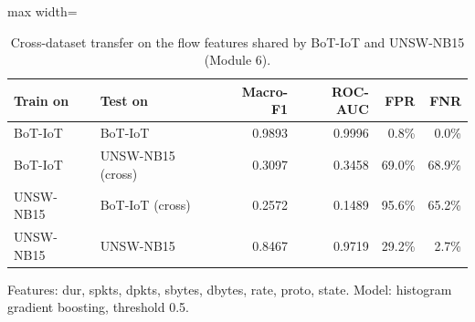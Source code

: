 \begin{table}[t]
\centering
\caption{Cross-dataset transfer on the flow features shared by BoT-IoT and UNSW-NB15 (Module 6).}
\label{tab:transfer}
\footnotesize
\setlength{\tabcolsep}{3.5pt}
\begin{adjustbox}{max width=\linewidth}
\begin{tabular}{llrrrr}
\toprule
Train on & Test on & Macro-F1 & ROC-AUC & FPR & FNR \\
\midrule
BoT-IoT & BoT-IoT & 0.9893 & 0.9996 & 0.8\% & 0.0\% \\
BoT-IoT & UNSW-NB15 (cross) & 0.3097 & 0.3458 & 69.0\% & 68.9\% \\
UNSW-NB15 & BoT-IoT (cross) & 0.2572 & 0.1489 & 95.6\% & 65.2\% \\
UNSW-NB15 & UNSW-NB15 & 0.8467 & 0.9719 & 29.2\% & 2.7\% \\
\bottomrule
\end{tabular}
\end{adjustbox}
\par\vspace{2pt}
\parbox{0.98\linewidth}{\scriptsize Features: dur, spkts, dpkts, sbytes, dbytes, rate, proto, state. Model: histogram gradient boosting, threshold 0.5.}
\end{table}
